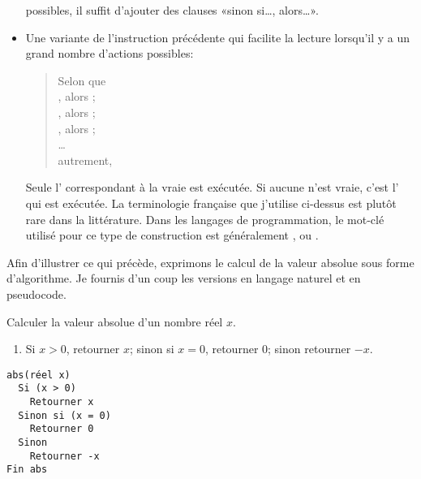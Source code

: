 \begin{itemize}
  possibles, il suffit d'ajouter des clauses «sinon si\dots, alors\dots».
\item Une variante de l'instruction précédente qui facilite la lecture
  lorsqu'il y a un grand nombre d'actions possibles:
  \begin{quote}
    Selon que \\
    , alors ; \\
    , alors ; \\
    , alors ; \\
    \dots \\
    autrement, 
  \end{quote}
  Seule l' correspondant à la  vraie est
  exécutée. Si aucune  n'est vraie, c'est
  l' qui est exécutée. La terminologie
  française que j'utilise ci-dessus est plutôt rare dans la
  littérature. Dans les langages de programmation, le mot-clé utilisé
  pour ce type de construction est généralement ,
   ou .
\end{itemize}

Afin d'illustrer ce qui précède, exprimons le calcul de la valeur
absolue sous forme d'algorithme. Je fournis d'un coup les versions en
langage naturel et en pseudocode.

\begin{algorithme}
  \label{algo:algorithmes:abs}
  Calculer la valeur absolue d'un nombre réel $x$.

  \noindent
  \begin{minipage}[t]{0.48\linewidth}
    \begin{enumerate}
    \item Si $x > 0$, retourner $x$; sinon si $x = 0$, retourner $0$;
      sinon retourner $-x$.
    \end{enumerate}
  \end{minipage}
  \hfill
  \begin{minipage}[t]{0.48\linewidth}
    \begin{Schunk}
\begin{Verbatim}
abs(réel x)
  Si (x > 0)
    Retourner x
  Sinon si (x = 0)
    Retourner 0
  Sinon
    Retourner -x
Fin abs
\end{Verbatim}
    \end{Schunk}
  \end{minipage}
\end{algorithme}

